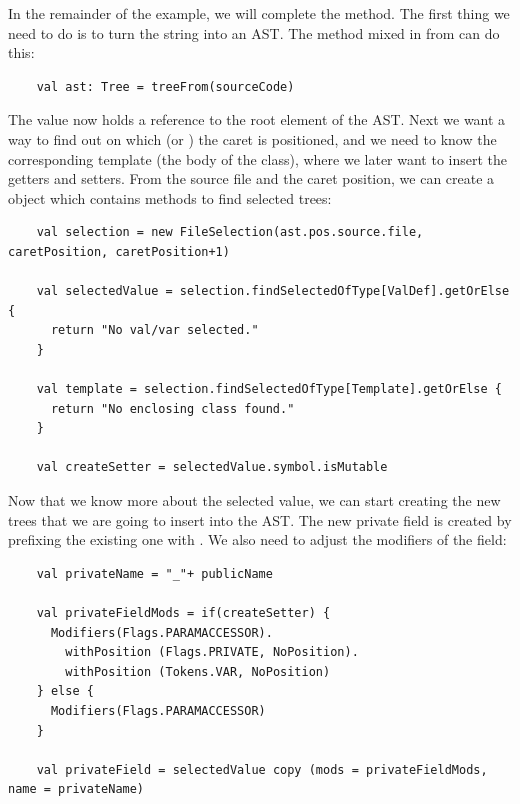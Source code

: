 \documentclass[10pt,a4paper,oneside]{scrreprt}
\begin{document}
In the remainder of the example, we will complete the  method. The first thing we need to do is to turn the  string into an AST. The  method mixed in from  can do this:

\begin{lstlisting}
    val ast: Tree = treeFrom(sourceCode)
\end{lstlisting}

The  value now holds a reference to the root element of the AST. Next we want a way to find out on which  (or ) the caret is positioned, and we need to know the corresponding template (the body of the class), where we later want to insert the getters and setters. From the source file and the caret position, we can create a  object which contains methods to find selected trees:
    
\begin{lstlisting}
    val selection = new FileSelection(ast.pos.source.file, caretPosition, caretPosition+1)
    
    val selectedValue = selection.findSelectedOfType[ValDef].getOrElse {
      return "No val/var selected."
    }
    
    val template = selection.findSelectedOfType[Template].getOrElse {
      return "No enclosing class found."
    }

    val createSetter = selectedValue.symbol.isMutable
\end{lstlisting}

Now that we know more about the selected value, we can start creating the new trees that we are going to insert into the AST. The new private field is created by prefixing the existing one with \src{\_}. We also need to adjust the modifiers of the field:

\begin{lstlisting}
    val privateName = "_"+ publicName
    
    val privateFieldMods = if(createSetter) {
      Modifiers(Flags.PARAMACCESSOR).
        withPosition (Flags.PRIVATE, NoPosition).
        withPosition (Tokens.VAR, NoPosition)
    } else {
      Modifiers(Flags.PARAMACCESSOR)
    }
      
    val privateField = selectedValue copy (mods = privateFieldMods, name = privateName)
\end{lstlisting}
\end{document}
